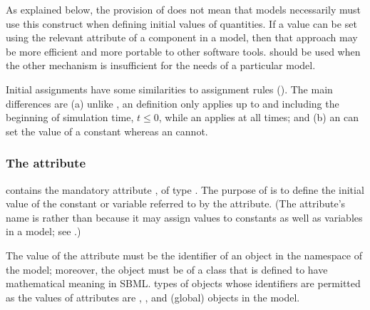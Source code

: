 As explained below, the provision of \InitialAssignment does not
mean that models necessarily must use this construct when defining
initial values of quantities.  If a value can be set
using the relevant attribute of a component in a model, then
that approach may be more efficient and more portable to other
software tools.  \InitialAssignment should be used when the other
mechanism is insufficient for the needs of a particular model.

Initial assignments have some similarities to assignment rules
().  The main differences are (a)
unlike \AssignmentRule, an \InitialAssignment definition only
applies up to and including the beginning of simulation time, \ie
$t \leq 0$, while an \AssignmentRule applies at all times; and (b)
an \InitialAssignment can set the value of a constant whereas an
\AssignmentRule cannot.


\label{sec:initialassignment-id}



\subsubsection{The  attribute}

\InitialAssignment contains the mandatory attribute , of type .  The purpose of \InitialAssignment is to define the initial value of the constant or variable referred to by the  attribute.  (The attribute's name is  rather than  because it may assign values to constants as well as variables in a model; see .)

The value of the  attribute must be the identifier of an object in the  namespace of the model; moreover, the object must be of a class that is defined to have mathematical meaning in SBML.   types of objects whose identifiers are permitted as the values of \InitialAssignment {} attributes are \Compartment, \Species, \SpeciesReference and (global) \Parameter objects in the model.  


